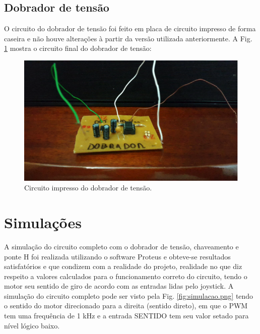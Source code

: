 \subsection{Dobrador de tensão}

O circuito do dobrador de tensão foi feito em placa de circuito impresso de forma caseira e não houve alterações à partir da versão utilizada anteriormente. A Fig. \ref{fig:circuito_dobrador.png} mostra o circuito final do dobrador de tensão:

\begin{figure}
    \begin{center}
        \includegraphics{figuras/circuito_dobrador.png}
    \end{center}
    \caption{Circuito impresso do dobrador de tensão.}
    \label{fig:circuito_dobrador.png}
\end{figure}

\section{Simulações}

A simulação do circuito completo com o dobrador de tensão, chaveamento e ponte H foi realizada utilizando o software Proteus e obteve-se resultados satisfatórios e que condizem com a realidade do projeto, realidade no que diz respeito a valores calculados para o funcionamento correto do circuito, tendo o motor seu sentido de giro de acordo com as entradas lidas pelo joystick. A simulação do circuito completo pode ser visto pela Fig. \ref{fig:simulacao.png} tendo o sentido do motor direcionado para a direita (sentido direto), em que o PWM tem uma frequência de 1 kHz e a entrada SENTIDO tem seu valor setado para nível lógico baixo.

